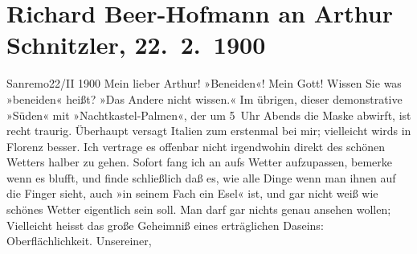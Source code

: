 

         
         \renewcommand{\erwaehntePersonen}{Personen: Christian Wilhelm Allers, Paula Beer-Hofmann, Mirjam Beer-Hofmann, Georg Brandes, Berta Doepler, Georg Hirschfeld, Robert Hirschfeld, Hugo von Hofmannsthal, Oskar Mayer, Max Messer, Elly Petersen, Gustav Schwarzkopf}
         \renewcommand{\erwaehnteOrte}{Orte: Bad Ischl, Florenz, Italien, Sanremo, Wien}
         \renewcommand{\erwaehnteWerke}{Werke: Der Tod Georgs, Kabale und Liebe, Wiener Bummelgeschichten}
               \section[Richard Beer-Hofmann an Arthur Schnitzler, 22. 2. 1900]{ Richard Beer-Hofmann an Arthur Schnitzler, 22. 2. 1900}\nopagebreak{}\rehead{ }\begin{ledgroupsized}[t]{13cm}\normalsize\beginnumbering \toendnotes[C]{\smallbreak\pagebreak[2]} 
\toendnotes[C]{\smallbreak}\pstart
           \raggedleft{}{\pb}Sanremo22/II 1900\pend
           \pstart
           Mein lieber Arthur! »Beneiden«! Mein Gott! Wissen Sie was »beneiden«
               heißt? »Das Andere nicht wissen.« Im übrigen, dieser demonstrative »Süden« mit
               »Nachtkastel-Palmen«, der um 5 Uhr Abends die Maske abwirft, ist recht traurig.
               Überhaupt versagt Italien zum erstenmal bei mir;
               vielleicht wirds in Florenz besser. Ich vertrage es
               offenbar nicht irgendwohin direkt des schönen Wetters halber zu gehen. Sofort fang
               ich an aufs Wetter aufzupassen, bemerke wenn es blufft, und finde schließlich daß es,
               wie alle Dinge wenn man ihnen auf die Finger sieht, auch »in seinem Fach ein Esel«
               ist, und gar nicht weiß wie schönes Wetter eigentlich sein soll. Man darf gar nichts
               genau ansehen wollen; {\pb}Vielleicht
               heisst das große Geheimniß eines erträglichen Daseins: Oberflächlichkeit. Unsereiner,

\end{ledgroupsized}
